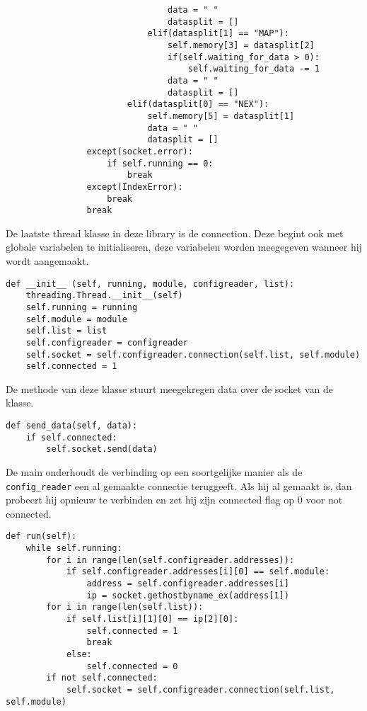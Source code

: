 \documentclass[a4paper,10pt]{article}
\begin{document}
\begin{verbatim}
                                data = " "
                                datasplit = []
                            elif(datasplit[1] == "MAP"):
                                self.memory[3] = datasplit[2]
                                if(self.waiting_for_data > 0):
                                    self.waiting_for_data -= 1
                                data = " "
                                datasplit = []
                        elif(datasplit[0] == "NEX"):
                            self.memory[5] = datasplit[1]
                            data = " "
                            datasplit = []                                    
                except(socket.error):
                    if self.running == 0:
                        break
                except(IndexError):
                    break
                break
\end{verbatim}
De laatste thread klasse in deze library is de connection. Deze begint ook met globale variabelen te initialiseren, deze variabelen worden meegegeven wanneer hij wordt aangemaakt.
\begin{verbatim}
def __init__ (self, running, module, configreader, list):
    threading.Thread.__init__(self)
    self.running = running
    self.module = module
    self.list = list
    self.configreader = configreader
    self.socket = self.configreader.connection(self.list, self.module)
    self.connected = 1
\end{verbatim}
De methode van deze klasse stuurt meegekregen data over de socket van de klasse.
\begin{verbatim}
def send_data(self, data):
    if self.connected:
        self.socket.send(data)
\end{verbatim}
De main onderhoudt de verbinding op een soortgelijke manier als de \verb!config_reader! een al gemaakte connectie teruggeeft. Als hij al gemaakt is, dan probeert hij opnieuw te verbinden en zet hij zijn connected flag op 0 voor not connected.
\begin{verbatim}
def run(self):
    while self.running:
        for i in range(len(self.configreader.addresses)):
            if self.configreader.addresses[i][0] == self.module:
                address = self.configreader.addresses[i]
                ip = socket.gethostbyname_ex(address[1])
        for i in range(len(self.list)):
            if self.list[i][1][0] == ip[2][0]:
                self.connected = 1
                break
            else:
                self.connected = 0
        if not self.connected:
            self.socket = self.configreader.connection(self.list, self.module)
\end{verbatim}
\end{document}
